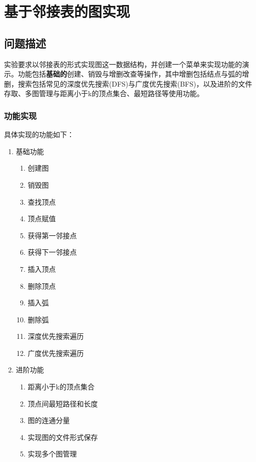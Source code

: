 \documentclass[supercite]{Experimental_Report}
\theoremstyle{definition}
\begin{document}
\section{基于邻接表的图实现}



\subsection{问题描述}

实验要求以邻接表的形式实现图这一数据结构，并创建一个菜单来实现功能的演示。功能包括\textbf{基础的}创建、销毁与增删改查等操作，其中增删包括结点与弧的增删，搜索包括常见的深度优先搜索(DFS)与广度优先搜索(BFS)，以及进阶的文件存取、多图管理与距离小于k的顶点集合、最短路径等使用功能。

\subsubsection{功能实现}

具体实现的功能如下：

\begin{enumerate}
	\item 基础功能
		\begin{enumerate}
			\item 创建图
			\item 销毁图
			\item 查找顶点
			\item 顶点赋值
			\item 获得第一邻接点
			\item 获得下一邻接点
			\item 插入顶点
			\item 删除顶点
			\item 插入弧
			\item 删除弧
			\item 深度优先搜索遍历
			\item 广度优先搜索遍历
		\end{enumerate}
	\item 进阶功能
		\begin{enumerate}
			\item 距离小于k的顶点集合
			\item 顶点间最短路径和长度
			\item 图的连通分量
			\item 实现图的文件形式保存
			\item 实现多个图管理
		\end{enumerate}
\end{enumerate}
\end{document}
